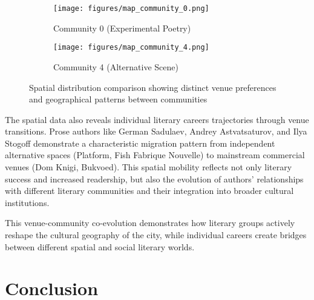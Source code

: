 \documentclass{jcls}
\begin{document}
\begin{figure}
    \centering
    \begin{subfigure}{0.48\textwidth}
        \centering
        \texttt{[image: figures/map\_community\_0.png]}
        \caption{Community 0 (Experimental Poetry)}
        \label{fig:community0}
    \end{subfigure}
    \hfill
    \begin{subfigure}{0.48\textwidth}
        \centering
        \texttt{[image: figures/map\_community\_4.png]}
        \caption{Community 4 (Alternative Scene)}
        \label{fig:community4}
    \end{subfigure}
    \caption{Spatial distribution comparison showing distinct venue preferences and geographical patterns between communities}
    \label{spatial_comparison}
\end{figure}

The spatial data also reveals individual literary careers trajectories through venue transitions. Prose authors like German Sadulaev, Andrey Astvatsaturov, and Ilya Stogoff demonstrate a characteristic migration pattern from independent alternative spaces (Platform, Fish Fabrique Nouvelle) to mainstream commercial venues (Dom Knigi, Bukvoed). This spatial mobility reflects not only literary success and increased readership, but also the evolution of authors' relationships with different literary communities and their integration into broader cultural institutions.

This venue-community co-evolution demonstrates how literary groups actively reshape the cultural geography of the city, while individual careers create bridges between different spatial and social literary worlds.

\section{Conclusion}
\end{document}
